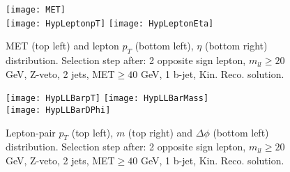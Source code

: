 


\begin{figure}
  \texttt{[image: MET]}\\
  \texttt{[image: HypLeptonpT]}
  \texttt{[image: HypLeptonEta]}\\
  \caption{MET (top left) and lepton $p_T$ (bottom left), $\eta$ (bottom right) distribution. Selection step after: 2 opposite sign lepton, $m_{ll}\geq20$ GeV, Z-veto, 2 jets, MET$\geq40$ GeV, 1 b-jet, Kin. Reco. solution.}
\end{figure}

\clearpage
\newpage


\begin{figure}
  \texttt{[image: HypLLBarpT]}
  \texttt{[image: HypLLBarMass]}\\
  \texttt{[image: HypLLBarDPhi]}
  \caption{Lepton-pair $p_T$ (top left), $m$ (top right) and $\Delta\phi$ (bottom left) distribution. Selection step after: 2 opposite sign lepton, $m_{ll}\geq20$ GeV, Z-veto, 2 jets, MET$\geq40$ GeV, 1 b-jet, Kin. Reco. solution.}
\end{figure}

\clearpage
\newpage



